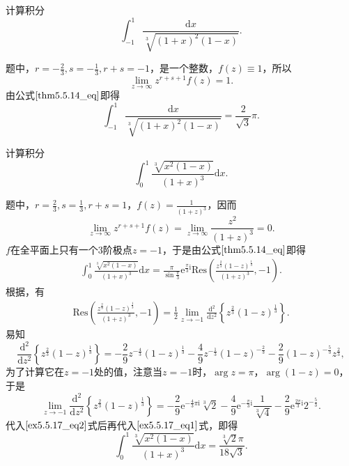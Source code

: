 \documentclass[../../main.tex]{subfiles}%
\begin{document}
\begin{example}
计算积分
\[
\int_{-1}^{1} \frac{\mathrm{d}x}{\sqrt[3]{(1 + x)^2 (1 - x)}}.
\]
\end{example}
\begin{solution}

题中，\( r = -\frac{2}{3}, s = -\frac{1}{3}, r + s = -1 \)，是一个整数，\( f(z) \equiv 1 \)，所以
\[
\lim_{z \to \infty} z^{r + s + 1} f(z) = 1.
\]
由公式\(\eqref{thm5.5.14_eq}\)即得
\[
\int_{-1}^{1} \frac{\mathrm{d}x}{\sqrt[3]{(1 + x)^2 (1 - x)}} = \frac{2}{\sqrt{3}} \pi.
\]

\end{solution}

\begin{example}
计算积分
\[
\int_{0}^{1} \frac{\sqrt[3]{x^2 (1 - x)}}{(1 + x)^3} \mathrm{d}x.
\]
\end{example}
\begin{solution}

题中，\( r = \frac{2}{3}, s = \frac{1}{3}, r + s = 1 \)，\( f(z) = \frac{1}{(1 + z)^3} \)，因而
\[
\lim_{z \to \infty} z^{r + s + 1} f(z) = \lim_{z \to \infty} \frac{z^2}{(1 + z)^3} = 0.
\]
\( f \)在全平面上只有一个3阶极点\( z = -1 \)，于是由公式\(\eqref{thm5.5.14_eq}\)即得
\begin{align}
\int_{0}^{1} \frac{\sqrt[3]{x^2 (1 - x)}}{(1 + x)^3} \mathrm{d}x = \frac{\pi}{\sin \frac{\pi}{3}} \mathrm{e}^{\frac{\pi}{3} \mathrm{i}} \mathrm{Res}\left( \frac{z^{\frac{2}{3}} (1 - z)^{\frac{1}{3}}}{(1 + z)^3}, -1 \right). \label{ex5.5.17_eq1}
\end{align}
根据，有
\begin{align}
\mathrm{Res}\left( \frac{z^{\frac{2}{3}} (1 - z)^{\frac{1}{3}}}{(1 + z)^3}, -1 \right) = \frac{1}{2} \lim_{z \to -1} \frac{\mathrm{d}^2}{\mathrm{d}z^2} \left\{ z^{\frac{2}{3}} (1 - z)^{\frac{1}{3}} \right\}. \label{ex5.5.17_eq2}
\end{align}
易知
\[
\frac{\mathrm{d}^2}{\mathrm{d}z^2} \left\{ z^{\frac{2}{3}} (1 - z)^{\frac{1}{3}} \right\} = -\frac{2}{9} z^{-\frac{4}{3}} (1 - z)^{\frac{1}{3}} - \frac{4}{9} z^{-\frac{1}{3}} (1 - z)^{-\frac{2}{3}}
- \frac{2}{9} (1 - z)^{-\frac{5}{3}} z^{\frac{2}{3}},
\]
为了计算它在\( z = -1 \)处的值，注意当\( z = -1 \)时，\(\arg z = \pi\)，\(\arg(1 - z) = 0\)，于是
\[
\lim_{z \to -1} \frac{\mathrm{d}^2}{\mathrm{d}z^2} \left\{ z^{\frac{2}{3}} (1 - z)^{\frac{1}{3}} \right\} = -\frac{2}{9} \mathrm{e}^{-\frac{4}{3} \pi \mathrm{i}} \sqrt[3]{2} - \frac{4}{9} \mathrm{e}^{-\frac{\pi}{3} \mathrm{i}} \frac{1}{\sqrt[3]{4}}
- \frac{2}{9} \mathrm{e}^{\frac{2\pi}{3} \mathrm{i}} 2^{-\frac{5}{3}}.
\]
代入\(\eqref{ex5.5.17_eq2}\)式后再代入\(\eqref{ex5.5.17_eq1}\)式，即得
\[
\int_{0}^{1} \frac{\sqrt[3]{x^2 (1 - x)}}{(1 + x)^3} \mathrm{d}x = \frac{\sqrt[3]{2} \pi}{18 \sqrt{3}}.
\]

\end{solution}
\end{document}
